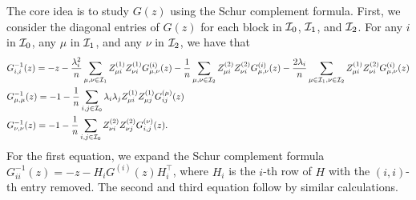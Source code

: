 The core idea is to study $G(z)$ using the Schur complement formula.
First, we consider the diagonal entries of $G(z)$ for each block in $\cal I_0$, $\cal I_1$, and $\cal I_2$.
For any $i$ in $\cal I_0$, any $\mu$ in $\cal I_1$, and any $\nu$ in $\cal I_2$, we have that
\begin{align*}
	&G_{i,i}^{-1}(z) = -z - \frac{\lambda_i^2}{n} \sum_{\mu,\nu\in \mathcal I_1} Z^{(1)}_{\mu i}Z^{(1)}_{\nu i}G^{\left( i \right)}_{\mu,\nu}(z) - \frac{1}{n} \sum_{\mu,\nu\in \mathcal I_2} Z^{(2)}_{\mu i}Z^{(2)}_{\nu i} G^{\left( i \right)}_{\mu,\nu}(z) -\frac{2\lambda_i}{n} \sum_{\mu\in \cal I_1,\nu\in \mathcal I_2} Z^{(1)}_{\mu i}Z^{(2)}_{\nu i}G^{\left( i \right)}_{\mu,\nu}(z) \\
	&G_{\mu,\mu}^{-1}(z) =  - 1 - \frac{1}{n} \sum_{i,j\in \mathcal I_0}\lambda_i \lambda_j Z^{(1)}_{\mu i}Z^{(1)}_{\mu j} G^{\left(\mu\right)}_{ij}(z) \\
	&G_{\nu,\nu}^{-1}(z) =  - 1 - \frac{1}{n} \sum_{i,j\in \mathcal I_0}  Z^{(2)}_{\nu i}Z^{(2)}_{\nu j}  G^{\left(\nu\right)}_{i,j}(z).
\end{align*}
For the first equation, we expand the Schur complement formula $G_{ii}^{-1}(z) = -z - H_i G^{(i)}(z) H_{i}^\top$, where $H_i$ is the $i$-th row of $H$ with the $(i,i)$-th entry removed.
The second and third equation follow by similar calculations.


